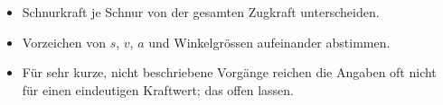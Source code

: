 \begin{achtung}
\begin{itemize}
  \item Schnurkraft je Schnur von der gesamten Zugkraft unterscheiden.
  \item Vorzeichen von $s$, $v$, $a$ und Winkelgrössen aufeinander abstimmen.
  \item Für sehr kurze, nicht beschriebene Vorgänge reichen die Angaben oft
        nicht für einen eindeutigen Kraftwert; das offen lassen.
\end{itemize}
\end{achtung}
